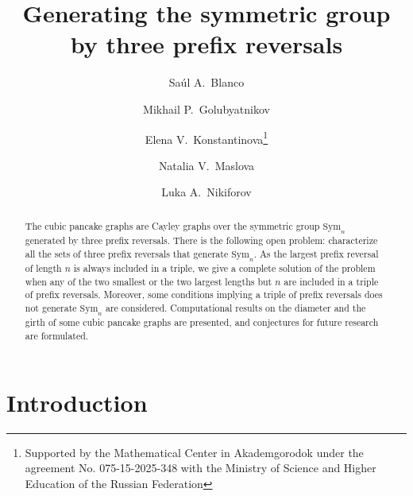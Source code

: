 \documentclass[
final
]{dmtcs-episciences}
\author[Blanco, Golubyatnikov, Konstantinova, Maslova, and Nikiforov]{
Sa\'ul A.~Blanco\affiliationmark{1}\and Mikhail P.~Golubyatnikov\affiliationmark{2,3}\\\and Elena V.~Konstantinova\affiliationmark{4,5,6}\thanks{Supported by the Mathematical Center in Akademgorodok under the agreement No. 075-15-2025-348 with the Ministry of Science and Higher Education of the Russian Federation}\and Natalia V.~Maslova\affiliationmark{2,3}\\\and Luka A.~Nikiforov\affiliationmark{6}
}
\title{Generating the symmetric group by three prefix reversals}
\affiliation{
  Department of Computer Science, Indiana University, Bloomington, USA\\
  Krasovskii Institute of Mathematics and Mechanics Yekaterinburg, Russia\\
  Ural Mathematical Center, Yekaterinburg, Russia\\
  Sobolev Institute of Mathematics, Novosibirsk, Russia\\
  Novosibirsk State University, Novosibirsk, Russia\\
  Three Gorges Mathematical Research Center, China Three Gorges University,  Yichang,  China}
\begin{document}
\maketitle

\begin{abstract}
The cubic pancake graphs are Cayley graphs over the symmetric group $\mathrm{Sym}_n$ generated by three prefix reversals. There is the following open problem: characterize all the sets of three prefix reversals that generate $\mathrm{Sym}_n$. As the largest prefix reversal of length $n$ is always included in a triple, we give a complete solution of the problem when any of the two smallest or the two largest lengths but $n$ are included in a triple of prefix reversals. Moreover, some conditions implying a triple of prefix reversals does not generate $\mathrm{Sym}_n$ are considered. Computational results on the diameter and the girth of some cubic pancake graphs are presented, and conjectures for future research are formulated.
\end{abstract}


\section{Introduction}\label{sec0}
\end{document}
